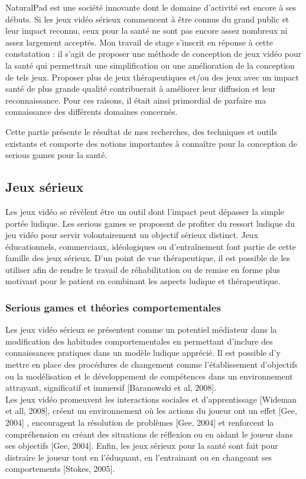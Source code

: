 NaturalPad est une société innovante dont le domaine d'activité est encore à ses débuts. Si les jeux vidéo sérieux commencent à être connus du grand public et leur impact reconnu, ceux pour la santé ne sont pas encore assez nombreux ni assez largement acceptés. Mon travail de stage s'inscrit en réponse à cette constatation : il s'agit de proposer une méthode de conception de jeux vidéo pour la santé qui permettrait une simplification ou une amélioration de la conception de tels jeux. Proposer plus de jeux  thérapeutiques et/ou des jeux avec un impact santé de plus grande qualité contribuerait à améliorer leur diffusion et leur reconnaissance. Pour ces raisons, il était ainsi primordial de parfaire ma connaissance des différents domaines concernés.

Cette partie présente le résultat de mes recherches, des techniques et outils existants et comporte des notions importantes à connaître pour la conception de serious games pour la santé.




	\subsection{Jeux sérieux}
Les jeux vidéo se révèlent être un outil dont l’impact peut dépasser la simple portée ludique. Les serious games se proposent de profiter du ressort ludique du jeu vidéo pour servir volontairement un objectif sérieux distinct. Jeux éducationnels, commerciaux, idéologiques ou d’entraînement font partie de cette famille des jeux sérieux. D’un point de vue thérapeutique, il est possible de les utiliser afin de rendre le travail de réhabilitation ou de remise en forme plus motivant pour le patient en combinant les aspects ludique et thérapeutique.

		\subsubsection{Serious games et théories comportementales}
Les jeux vidéo sérieux se présentent comme un potentiel médiateur dans la modification des habitudes comportementales en permettant d’inclure des connaissances pratiques dans un modèle ludique apprécié. Il est possible d’y mettre en place des procédures de changement comme l’établissement d’objectifs ou la modélisation et le développement de compétences dans un environnement attrayant, significatif et immersif [Baranowski et al, 2008]\cite{Bara08}. \\
Les jeux vidéo promeuvent les interactions sociales et d’apprentissage [Wideman et all, 2008], créent un environnement où les actions du joueur ont un effet [Gee, 2004]\cite{Gee04} , encouragent la résolution de problèmes [Gee, 2004]\cite{Gee04} et renforcent la compréhension en créant des situations de réflexion ou en aidant le joueur dans ses objectifs [Gee, 2004]\cite{Gee04}. Enfin, les jeux sérieux pour la santé sont fait pour distraire le joueur tout en l’éduquant, en l’entrainant ou en changeant ses comportements [Stokes, 2005]\cite{Stok05}.

